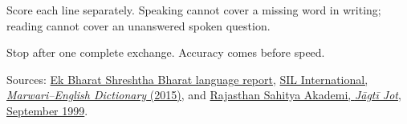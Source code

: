 Score each line separately. Speaking cannot cover a missing word in writing; reading cannot cover an unanswered spoken question.

\begin{tcolorbox}[breakable,colback=teal!4,colframe=teal!35!black,title={Before you move on}]
Stop after one complete exchange. Accuracy comes before speed.

Sources: \href{https://www.rgmcet.edu.in/assets/img/documents/Campus\%20Life/Other\%20Reports.pdf}{Ek Bharat Shreshtha Bharat language report}, \href{https://nepal.sil.org/resources/archives/63768}{SIL International, \emph{Marwari–English Dictionary} (2015)}, and \href{https://rsad.artandculture.rajasthan.gov.in/content/dam/doitassets/art-and-culture/Rajasthani-Bhasha-Sahitya-Avm-Sanskriti-Academy-Bikaner/pdf/jjpdf/JJ\_28\_06\_06\_September\_to\_September\_1999.pdf}{Rajasthan Sahitya Akademi, \emph{Jāgtī Jot}, September 1999}.
\end{tcolorbox}

